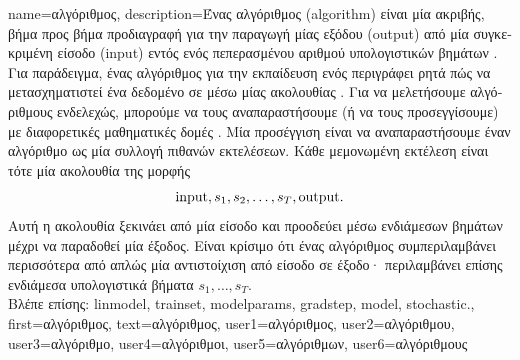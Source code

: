 {name={\foreignlanguage{greek}{αλγόριθμος}},
 	description={\foreignlanguage{greek}{Ένας} 
		\foreignlanguage{greek}{αλγόριθμος} (algorithm) \foreignlanguage{greek}{είναι μία ακριβής, βήμα προς βήμα προδιαγραφή για την  
		παραγωγή μίας εξόδου} (output) \foreignlanguage{greek}{από μία συγκεκριμένη είσοδο} (input) \foreignlanguage{greek}{εντός ενός πεπερασμένου 
		αριθμού υπολογιστικών βημάτων} \cite{Cormen:2022aa}. \foreignlanguage{greek}{Για παράδειγμα, ένας αλγόριθμος για την εκπαίδευση ενός} 
		 \foreignlanguage{greek}{περιγράφει ρητά πώς να μετασχηματιστεί ένα δεδομένο}  
		\foreignlanguage{greek}{σε}  \foreignlanguage{greek}{μέσω μίας ακολουθίας} 
		. \foreignlanguage{greek}{Για να μελετήσουμε αλγόριθμους ενδελεχώς, μπορούμε να τους αναπαραστήσουμε 
		(ή να τους προσεγγίσουμε) με διαφορετικές μαθηματικές δομές} \cite{Sipser2013}. \foreignlanguage{greek}{Μία προσέγγιση είναι να 
		αναπαραστήσουμε έναν αλγόριθμο ως μία συλλογή πιθανών εκτελέσεων. Κάθε μεμονωμένη εκτέλεση είναι τότε μία ακολουθία της  
		μορφής $${\rm input}, s_1, s_2, \ldots, s_T, {\rm output}.$$ Αυτή η ακολουθία ξεκινάει από μία είσοδο και προοδεύει μέσω ενδιάμεσων βημάτων 
		μέχρι να παραδοθεί μία έξοδος. Είναι κρίσιμο ότι ένας αλγόριθμος συμπεριλαμβάνει περισσότερα από απλώς μία αντιστοίχιση από είσοδο 
		σε έξοδο· περιλαμβάνει επίσης ενδιάμεσα υπολογιστικά βήματα} $s_1, \ldots, s_T$.\\
		\foreignlanguage{greek}{Βλέπε επίσης:} \gls{linmodel}, \gls{trainset}, \gls{modelparams}, \gls{gradstep}, \gls{model}, \gls{stochastic}.},
	first={\foreignlanguage{greek}{αλγόριθμος}},
	text={\foreignlanguage{greek}{αλγόριθμος}},
	user1={\foreignlanguage{greek}{αλγόριθμος}}, %
	user2={\foreignlanguage{greek}{αλγόριθμου}}, %
	user3={\foreignlanguage{greek}{αλγόριθμο}}, %
	user4={\foreignlanguage{greek}{αλγόριθμοι}}, %
	user5={\foreignlanguage{greek}{αλγόριθμων}}, %
	user6={\foreignlanguage{greek}{αλγόριθμους}} %
}

